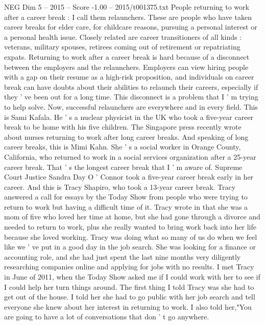 \begin{textsample}{NEG Dim 5 – 2015 – Score -1.00 – 2015/t001375.txt}  \label{ex:f5_neg_029}
People returning to work after a career break : I call them relaunchers.
These are people who have taken career breaks for elder care, for childcare reasons, pursuing a personal interest or a personal health issue.
Closely related are career transitioners of all kinds : veterans, military spouses, retirees coming out of retirement or repatriating expats.
Returning to work after a career break is hard because of a disconnect between the employers and the relaunchers.
Employers can view hiring people with a gap on their resume as a high-risk proposition, and individuals on career break can have doubts about their abilities to relaunch their careers, especially if they ' ve been out for a long time.
This disconnect is a problem that I ' m trying to help solve.
Now, successful relaunchers are everywhere and in every field.
This is Sami Kafala.
He ' s a nuclear physicist in the UK who took a five-year career break to be home with his five children.
The Singapore press recently wrote about nurses returning to work after long career breaks.
And speaking of long career breaks, this is Mimi Kahn.
She ' s a social worker in Orange County, California, who returned to work in a social services organization after a 25-year career break.
That ' s the longest career break that I ' m aware of.
Supreme Court Justice Sandra Day O ' Connor took a five-year career break early in her career.
And this is Tracy Shapiro, who took a 13-year career break.
Tracy answered a call for essays by the Today Show from people who were trying to return to work but having a difficult time of it.
Tracy wrote in that she was a mom of five who loved her time at home, but she had gone through a divorce and needed to return to work, plus she really wanted to bring work back into her life because she loved working.
Tracy was doing what so many of us do when we feel like we ' ve put in a good day in the job search.
She was looking for a finance or accounting role, and she had just spent the last nine months very diligently researching companies online and applying for jobs with no results.
I met Tracy in June of 2011, when the Today Show asked me if I could work with her to see if I could help her turn things around.
The first thing I told Tracy was she had to get out of the house.
I told her she had to go public with her job search and tell everyone she knew about her interest in returning to work.
I also told her,"You are going to have a lot of conversations that don ' t go anywhere.

\end{textsample}
